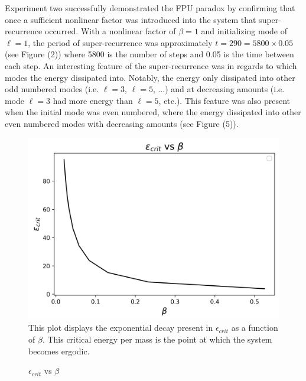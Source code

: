 \documentclass[twocolumn]{article}
\begin{document}
Experiment two successfully demonstrated the FPU paradox by confirming that once a sufficient nonlinear factor was introduced into the system that super-recurrence occurred. With a nonlinear factor of $\beta=1$ and initializing mode of $\ell=1$, the period of super-recurrence was approximately $t=290=5800\times0.05$ (see Figure (2)) where 5800 is the number of steps and 0.05 is the time between each step. An interesting feature of the super-recurrence was in regards to which modes the energy dissipated into. Notably, the energy only dissipated into other odd numbered modes (i.e. $\ell=3$, $\ell=5$, ...) and at decreasing amounts (i.e. mode $\ell=3$ had more energy than $\ell=5$, etc.). This feature was also present when the initial mode was even numbered, where the energy dissipated into other even numbered modes with decreasing amounts (see Figure (5)).
\begin{figure}[ht!]
\centering
\caption{$\epsilon_{crit}$ vs $\beta$}
\includegraphics[scale=.55]{Q3a}
\small{This plot displays the exponential decay present in $\epsilon_{crit}$ as a function of $\beta$. This critical energy per mass is the point at which the system becomes ergodic.}
\end{figure}
\end{document}
